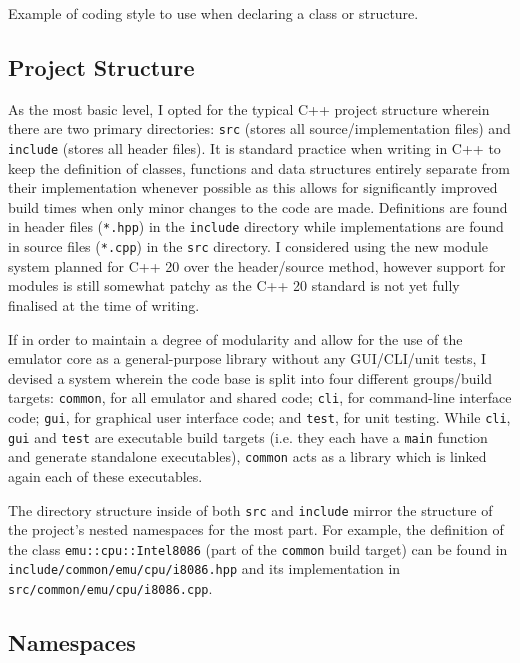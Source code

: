 		\begin{listing}[h]
			
			\caption{Example of coding style to use when declaring a class or structure.}
			\label{lst:class-example}
		\end{listing}

\subsection{Project Structure}
	As the most basic level, I opted for the typical C++ project structure wherein there are two primary directories: \texttt{src} (stores all source/implementation files) and \texttt{include} (stores all header files). It is standard practice when writing in C++ to keep the definition of classes, functions and data structures entirely separate from their implementation whenever possible as this allows for significantly improved build times when only minor changes to the code are made. Definitions are found in header files (\texttt{*.hpp}) in the \texttt{include} directory while implementations are found in source files (\texttt{*.cpp}) in the \texttt{src} directory. I considered using the new module system planned for C++ 20 over the header/source method, however support for modules is still somewhat patchy as the C++ 20 standard is not yet fully finalised at the time of writing.

	If in order to maintain a degree of modularity and allow for the use of the emulator core as a general-purpose library without any GUI/CLI/unit tests, I devised a system wherein the code base is split into four different groups/build targets: \texttt{common}, for all emulator and shared code; \texttt{cli}, for command-line interface code; \texttt{gui}, for graphical user interface code; and \texttt{test}, for unit testing. While \texttt{cli}, \texttt{gui} and \texttt{test} are executable build targets (i.e. they each have a \texttt{main} function and generate standalone executables), \texttt{common} acts as a library which is linked again each of these executables.

	The directory structure inside of both \texttt{src} and \texttt{include} mirror the structure of the project's nested namespaces for the most part. For example, the definition of the class \texttt{emu::cpu::Intel8086} (part of the \texttt{common} build target) can be found in \texttt{include/common/emu/cpu/i8086.hpp} and its implementation in \texttt{src/common/emu/cpu/i8086.cpp}.

\subsection{Namespaces}
